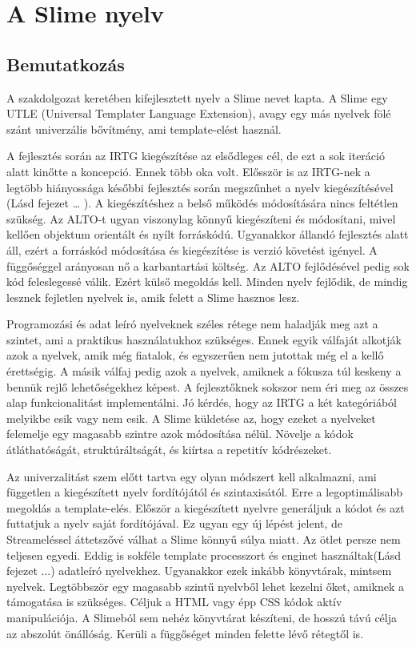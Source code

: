 \chapter{A Slime nyelv}
\label{sec:Slime}
\section{Bemutatkozás}
A szakdolgozat keretében kifejlesztett nyelv a Slime nevet kapta.
A Slime egy UTLE (Universal Templater Language Extension), 
avagy egy más nyelvek fölé szánt univerzális bővítmény, ami template-elést használ.

A fejlesztés során az IRTG kiegészítése az elsődleges cél, de ezt a sok iteráció alatt kinőtte a koncepció. 
Ennek több oka volt. 
Elősször is az IRTG-nek a legtöbb hiányossága későbbi fejlesztés során megszűnhet a nyelv kiegészítésével (Lásd fejezet … ). 
A kiegészítéshez a belső működés módosítására nincs feltétlen szükség. 
Az ALTO-t ugyan viszonylag könnyű kiegészíteni és módosítani, mivel kellően objektum orientált és nyílt forráskódú.
Ugyanakkor állandó fejlesztés alatt áll, ezért a forráskód módosítása és kiegészítése is verzió követést igényel. 
A függőséggel arányosan nő a karbantartási költség. 
Az ALTO fejlődésével pedig sok kód feleslegessé válik. 
Ezért külső megoldás kell. 
Minden nyelv fejlődik, de mindig lesznek fejletlen nyelvek is, amik felett a Slime hasznos lesz.

Programozási és adat leíró nyelveknek széles rétege nem haladják meg azt a szintet, ami a  praktikus használatukhoz szükséges. 
Ennek egyik válfaját alkotják azok a nyelvek, amik még fiatalok, és egyszerűen nem jutottak még el a kellő érettségig. 
A másik válfaj pedig azok a nyelvek, amiknek a fókusza túl keskeny a bennük rejlő lehetőségekhez képest.
A fejlesztőknek sokszor nem éri meg az összes alap funkcionalitást implementálni. 
Jó kérdés, hogy az IRTG a két kategóriából melyikbe esik vagy nem esik. 
A Slime küldetése az, hogy ezeket a nyelveket felemelje egy magasabb szintre azok módosítása nélül. 
Növelje a kódok átláthatóságát, struktúráltságát, és kiírtsa a repetitív kódrészeket.

Az univerzalitást szem előtt tartva egy olyan módszert kell alkalmazni, ami független a kiegészített nyelv fordítójától és szintaxisától. 
Erre a legoptimálisabb megoldás a template-elés. 
Először a kiegészített nyelvre generáljuk a kódot és azt futtatjuk a nyelv saját fordítójával. 
Ez ugyan egy új lépést jelent, de Streameléssel áttetszővé válhat a Slime könnyű súlya miatt. 
Az ötlet persze nem teljesen egyedi. 
Eddig is sokféle template processzort és enginet használtak(Lásd fejezet ...) adatleíró nyelvekhez. 
Ugyanakkor ezek inkább könyvtárak, mintsem nyelvek.
Legtöbbször egy magasabb szintű nyelvből lehet kezelni őket, amiknek a támogatása is szükséges. 
Céljuk a HTML vagy épp CSS kódok aktív manipulációja. 
A Slimeból sem nehéz könyvtárat készíteni, de hosszú távú célja az abszolút önállóság. 
Kerüli a függőséget minden felette lévő rétegtől is.

